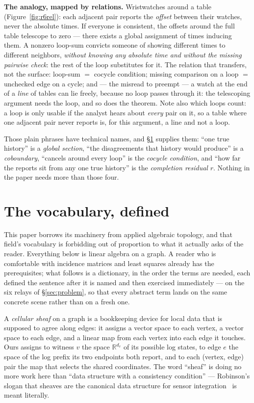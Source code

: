 \documentclass[11pt,a4paper]{article}
\begin{document}
\textbf{The analogy, mapped by relations.} Wristwatches around a table (Figure~\ref{fig:r6rel}): each adjacent pair reports
the \emph{offset} between their watches, never the absolute times. If everyone is consistent, the offsets around the full
table telescope to zero --- there exists a global assignment of times inducing them. A nonzero loop-sum convicts someone of
showing different times to different neighbors, \emph{without knowing any absolute time and without the missing pairwise
check}: the rest of the loop substitutes for it. The relation that transfers, not the surface: loop-sum $=$ cocycle
condition; missing comparison on a loop $=$ unchecked edge on a cycle; and --- the misread to preempt --- a watch at the end
of a \emph{line} of tables can lie freely, because no loop passes through it: the telescoping argument needs the loop, and so
does the theorem. Note also which loops count: a loop is only usable if the analyst hears about \emph{every} pair on it, so a
table where one adjacent pair never reports is, for this argument, a line and not a loop.

Those plain phrases have technical names, and \S\ref{sec:vocab} supplies them: ``one true history'' is a \emph{global
section}, ``the disagreements that history would produce'' is a \emph{coboundary}, ``cancels around every loop'' is the
\emph{cocycle condition}, and ``how far the reports sit from any one true history'' is the \emph{completion residual} $r$.
Nothing in the paper needs more than those four.



\section{The vocabulary, defined}\label{sec:vocab}

This paper borrows its machinery from applied algebraic topology, and that field's vocabulary is forbidding out of
proportion to what it actually asks of the reader. Everything below is linear algebra on a graph. A reader who is
comfortable with incidence matrices and least squares already has the prerequisites; what follows is a dictionary, in the
order the terms are needed, each defined the sentence after it is named and then exercised immediately --- on the six relays
of \S\ref{sec:problem}, so that every abstract term lands on the same concrete scene rather than on a fresh one.

A \emph{cellular sheaf} on a graph is a bookkeeping device for local data that is supposed to agree along edges: it assigns
a vector space to each vertex, a vector space to each edge, and a linear map from each vertex into each edge it touches.
Ours assigns to witness $v$ the space $\mathbb{R}^{d_v}$ of its possible log states, to edge $e$ the space of the log prefix
its two endpoints both report, and to each (vertex, edge) pair the map that selects the shared coordinates. The word
``sheaf'' is doing no more work here than ``data structure with a consistency condition'' --- Robinson's slogan that sheaves
are the canonical data structure for sensor integration~\cite{robinson} is meant literally.
\end{document}
